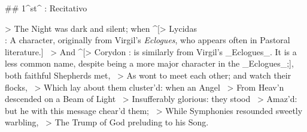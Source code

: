 ## 1^st^ \mvmt: Recitativo


> The Night was dark and silent; when ^[> Lycidas \\ : A character, originally from Virgil's \textit{Eclogues}, who appears often in Pastoral literature.] \
> And ^[> Corydon : is similarly from Virgil's _Eclogues_. It is a less common name, despite being a more major character in the _Eclogues_;], both faithful Shepherds met,  \
> As wont to meet each other; and watch their flocks,  \
> Which lay about them cluster’d: when an Angel  \
> From Heav’n descended on a Beam of Light  \
> Insufferably glorious: they stood  \
> Amaz’d: but he with this message chear’d them;  \
> While Symphonies resounded sweetly warbling,  \
> The Trump of God preluding to his Song.

